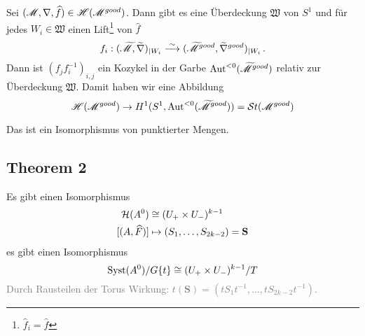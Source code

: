 Sei $(\mathscr{M},\nabla,\widehat f)\in\mathscr{H}(\mathscr{M}^{good})$. Dann gibt es eine Überdeckung
$\mathfrak{W}$ von $S^1$ und für jedes $W_i\in\mathfrak{W}$ einen
Lift\footnote{$\hat f_i=\hat f$} von $\hat f$
\[
  f_i:(\widetilde{\mathscr{M}},\widetilde\nabla)_{|W_i}
  \overset{\sim}{\longrightarrow}
  (\widetilde{\mathscr{M}}^{good},\widetilde\nabla^{good})_{|W_i} \,.
\]
Dann ist $(f_jf_i^{-1})_{i,j}$ ein Kozykel in der Garbe
$\operatorname{Aut}^{<0}(\widetilde{\mathscr{M}}^{good})$ relativ zur Überdeckung $\mathfrak{W}$.
Damit haben wir eine Abbildung
\[
  \mathscr{H}(\mathscr{M}^{good})\to H^1(S^1,\operatorname{Aut}^{<0}(\widetilde{\mathscr{M}}^{good}))=\mathcal{S}{}t(\mathscr{M}^{good})
\]
\begin{tthm}
  Das ist ein Isomorphismus von punktierter Mengen.
\end{tthm}
\subsection{Theorem 2} %

\begin{tthm}
  Es gibt einen Isomorphismus
  \begin{align*}
    \cH(A^0)&\cong(U_+\times U_-)^{k-1}
  \\ [(A,\hat F)]&\mapsto(S_1,\dots,S_{2k-2})=\textbf{S}
  \end{align*}
  es gibt einen Isomorphismus
  \[
    \operatorname{Syst}(A^0)/G\{t\}\cong(U_+\times U_-)^{k-1}/T
  \]
  \textcolor{gray}{Durch Rausteilen der Torus 
    Wirkung: $t(\textbf{S})=(tS_1t^{-1},\dots,tS_{2k-2}t^{-1})$.}
\end{tthm}

